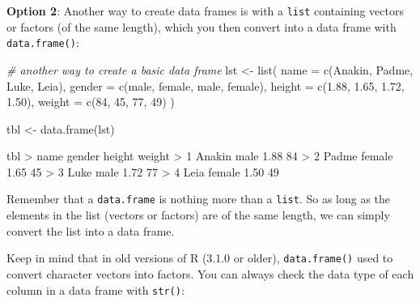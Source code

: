 \documentclass[
]{book}
\newenvironment{Shaded}{\begin{snugshade}}{\end{snugshade}}
\newcommand{\AttributeTok}[1]{\textcolor[rgb]{0.77,0.63,0.00}{#1}}
\newcommand{\CommentTok}[1]{\textcolor[rgb]{0.56,0.35,0.01}{\textit{#1}}}
\newcommand{\DecValTok}[1]{\textcolor[rgb]{0.00,0.00,0.81}{#1}}
\newcommand{\FloatTok}[1]{\textcolor[rgb]{0.00,0.00,0.81}{#1}}
\newcommand{\FunctionTok}[1]{\textcolor[rgb]{0.00,0.00,0.00}{#1}}
\newcommand{\NormalTok}[1]{#1}
\newcommand{\OtherTok}[1]{\textcolor[rgb]{0.56,0.35,0.01}{#1}}
\newcommand{\SpecialCharTok}[1]{\textcolor[rgb]{0.00,0.00,0.00}{#1}}
\newcommand{\StringTok}[1]{\textcolor[rgb]{0.31,0.60,0.02}{#1}}
\begin{document}
\textbf{Option 2}: Another way to create data frames is with a \texttt{list} containing
vectors or factors (of the same length), which you then convert into a data
frame with \texttt{data.frame()}:

\begin{Shaded}
\begin{Highlighting}[]
\CommentTok{\# another way to create a basic data frame}
\NormalTok{lst }\OtherTok{\textless{}{-}} \FunctionTok{list}\NormalTok{(}
  \AttributeTok{name =} \FunctionTok{c}\NormalTok{(}\StringTok{\textquotesingle{}Anakin\textquotesingle{}}\NormalTok{, }\StringTok{\textquotesingle{}Padme\textquotesingle{}}\NormalTok{, }\StringTok{\textquotesingle{}Luke\textquotesingle{}}\NormalTok{, }\StringTok{\textquotesingle{}Leia\textquotesingle{}}\NormalTok{),}
  \AttributeTok{gender =} \FunctionTok{c}\NormalTok{(}\StringTok{\textquotesingle{}male\textquotesingle{}}\NormalTok{, }\StringTok{\textquotesingle{}female\textquotesingle{}}\NormalTok{, }\StringTok{\textquotesingle{}male\textquotesingle{}}\NormalTok{, }\StringTok{\textquotesingle{}female\textquotesingle{}}\NormalTok{),}
  \AttributeTok{height =} \FunctionTok{c}\NormalTok{(}\FloatTok{1.88}\NormalTok{, }\FloatTok{1.65}\NormalTok{, }\FloatTok{1.72}\NormalTok{, }\FloatTok{1.50}\NormalTok{),}
  \AttributeTok{weight =} \FunctionTok{c}\NormalTok{(}\DecValTok{84}\NormalTok{, }\DecValTok{45}\NormalTok{, }\DecValTok{77}\NormalTok{, }\DecValTok{49}\NormalTok{)}
\NormalTok{)}

\NormalTok{tbl }\OtherTok{\textless{}{-}} \FunctionTok{data.frame}\NormalTok{(lst)}

\NormalTok{tbl}
\SpecialCharTok{\textgreater{}}\NormalTok{     name gender height weight}
\SpecialCharTok{\textgreater{}} \DecValTok{1}\NormalTok{ Anakin   male   }\FloatTok{1.88}     \DecValTok{84}
\SpecialCharTok{\textgreater{}} \DecValTok{2}\NormalTok{  Padme female   }\FloatTok{1.65}     \DecValTok{45}
\SpecialCharTok{\textgreater{}} \DecValTok{3}\NormalTok{   Luke   male   }\FloatTok{1.72}     \DecValTok{77}
\SpecialCharTok{\textgreater{}} \DecValTok{4}\NormalTok{   Leia female   }\FloatTok{1.50}     \DecValTok{49}
\end{Highlighting}
\end{Shaded}

Remember that a \texttt{data.frame} is nothing more than a \texttt{list}. So as long as the
elements in the list (vectors or factors) are of the same length, we can simply
convert the list into a data frame.

Keep in mind that in old versions of R (3.1.0 or older), \texttt{data.frame()} used to
convert character vectors into factors. You can always check the data type of
each column in a data frame with \texttt{str()}:
\end{document}
